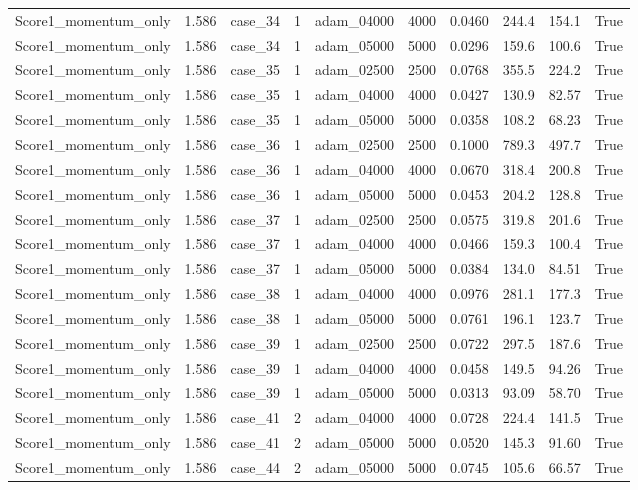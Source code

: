 \begin{longtable}{llllllllll}
Score1\_momentum\_only & 1.586 & case\_34 & 1 & adam\_04000 & 4000 & 0.0460 & 244.4 & 154.1 & True \\
Score1\_momentum\_only & 1.586 & case\_34 & 1 & adam\_05000 & 5000 & 0.0296 & 159.6 & 100.6 & True \\
Score1\_momentum\_only & 1.586 & case\_35 & 1 & adam\_02500 & 2500 & 0.0768 & 355.5 & 224.2 & True \\
Score1\_momentum\_only & 1.586 & case\_35 & 1 & adam\_04000 & 4000 & 0.0427 & 130.9 & 82.57 & True \\
Score1\_momentum\_only & 1.586 & case\_35 & 1 & adam\_05000 & 5000 & 0.0358 & 108.2 & 68.23 & True \\
Score1\_momentum\_only & 1.586 & case\_36 & 1 & adam\_02500 & 2500 & 0.1000 & 789.3 & 497.7 & True \\
Score1\_momentum\_only & 1.586 & case\_36 & 1 & adam\_04000 & 4000 & 0.0670 & 318.4 & 200.8 & True \\
Score1\_momentum\_only & 1.586 & case\_36 & 1 & adam\_05000 & 5000 & 0.0453 & 204.2 & 128.8 & True \\
Score1\_momentum\_only & 1.586 & case\_37 & 1 & adam\_02500 & 2500 & 0.0575 & 319.8 & 201.6 & True \\
Score1\_momentum\_only & 1.586 & case\_37 & 1 & adam\_04000 & 4000 & 0.0466 & 159.3 & 100.4 & True \\
Score1\_momentum\_only & 1.586 & case\_37 & 1 & adam\_05000 & 5000 & 0.0384 & 134.0 & 84.51 & True \\
Score1\_momentum\_only & 1.586 & case\_38 & 1 & adam\_04000 & 4000 & 0.0976 & 281.1 & 177.3 & True \\
Score1\_momentum\_only & 1.586 & case\_38 & 1 & adam\_05000 & 5000 & 0.0761 & 196.1 & 123.7 & True \\
Score1\_momentum\_only & 1.586 & case\_39 & 1 & adam\_02500 & 2500 & 0.0722 & 297.5 & 187.6 & True \\
Score1\_momentum\_only & 1.586 & case\_39 & 1 & adam\_04000 & 4000 & 0.0458 & 149.5 & 94.26 & True \\
Score1\_momentum\_only & 1.586 & case\_39 & 1 & adam\_05000 & 5000 & 0.0313 & 93.09 & 58.70 & True \\
Score1\_momentum\_only & 1.586 & case\_41 & 2 & adam\_04000 & 4000 & 0.0728 & 224.4 & 141.5 & True \\
Score1\_momentum\_only & 1.586 & case\_41 & 2 & adam\_05000 & 5000 & 0.0520 & 145.3 & 91.60 & True \\
Score1\_momentum\_only & 1.586 & case\_44 & 2 & adam\_05000 & 5000 & 0.0745 & 105.6 & 66.57 & True \\

\end{longtable}
